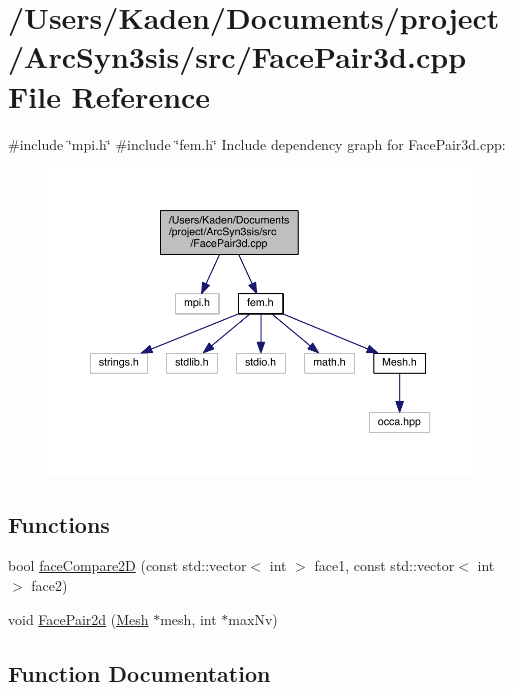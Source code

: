 \hypertarget{a00578}{}\section{/\+Users/\+Kaden/\+Documents/project/\+Arc\+Syn3sis/src/\+Face\+Pair3d.cpp File Reference}
\label{a00578}
{\ttfamily \#include \char`\"{}mpi.\+h\char`\"{}}\newline
{\ttfamily \#include \char`\"{}fem.\+h\char`\"{}}\newline
Include dependency graph for Face\+Pair3d.\+cpp\+:\nopagebreak
\begin{figure}[H]
\begin{center}
\leavevmode
\includegraphics[width=350pt]{a00579}
\end{center}
\end{figure}
\subsection*{Functions}
\begin{DoxyCompactItemize}
\item 
bool \hyperlink{a00578_a47244e0c661b3f7b5dde22b312884021}{face\+Compare2D} (const std\+::vector$<$ int $>$ face1, const std\+::vector$<$ int $>$ face2)
\item 
void \hyperlink{a00578_a73ad96b82acf2bf80fd24823a58b3f14}{Face\+Pair2d} (\hyperlink{a00557_aeffbe0891ab73a4d8964c9cb7978426e}{Mesh} $\ast$mesh, int $\ast$max\+Nv)
\end{DoxyCompactItemize}


\subsection{Function Documentation}
\mbox{\label{a00578_a47244e0c661b3f7b5dde22b312884021}} 
